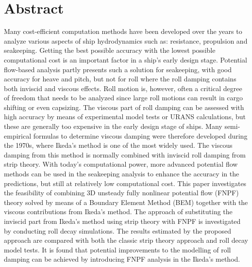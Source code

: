 \section{Abstract}\label{abstract}

Many cost-efficient computation methods have been developed over the
years to analyze various aspects of ship hydrodynamics such as:
resistance, propulsion and seakeeping. Getting the best possible
accuracy with the lowest possible computational cost is an important
factor in a ship's early design stage. Potential flow-based analysis
partly presents such a solution for seakeeping, with good accuracy for
heave and pitch, but not for roll where the roll damping contains both
inviscid and viscous effects. Roll motion is, however, often a critical
degree of freedom that needs to be analyzed since large roll motions can
result in cargo shifting or even capsizing. The viscous part of roll
damping can be assessed with high accuracy by means of experimental
model tests or URANS calculations, but these are generally too expensive
in the early design stage of ships. Many semi-empirical formulas to
determine viscous damping were therefore developed during the 1970s,
where Ikeda's method is one of the most widely used. The viscous damping
from this method is normally combined with inviscid roll damping from
strip theory. With today's computational power, more advanced potential
flow methods can be used in the seakeeping analysis to enhance the
accuracy in the predictions, but still at relatively low computational
cost. This paper investigates the feasibility of combining 3D unsteady
fully nonlinear potential flow (FNPF) theory solved by means of a
Boundary Element Method (BEM) together with the viscous contributions
from Ikeda's method. The approach of substituting the inviscid part from
Ikeda's method using strip theory with FNPF is investigated by
conducting roll decay simulations. The results estimated by the proposed
approach are compared with both the classic strip theory approach and
roll decay model tests. It is found that potential improvements to the
modelling of roll damping can be achieved by introducing FNPF analysis
in the Ikeda's method.

    